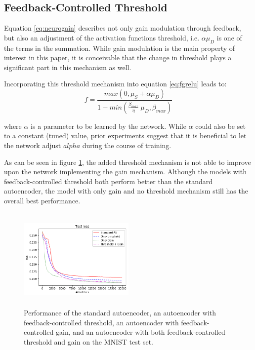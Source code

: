 \documentclass{article}
\begin{document}
\subsection{Feedback-Controlled Threshold} 
Equation \ref{eq:neurogain} describes not only gain modulation through feedback, but also an adjustment of the activation functions threshold, i.e. $\alpha \mu_D$ is one of the terms in the summation. While gain modulation is the main property of interest in this paper, it is conceivable that the change in threshold plays a significant part in this mechanism as well. 

Incorporating this threshold mechanism into equation \ref{eq:fgrelu} leads to: 
\begin{equation}
	f = \frac{max(0, \mu_S + \alpha \mu_D)}{1 - min(\frac{\beta_{max}}{\eta} \ \mu_D, \beta_{max})} 
\end{equation}

where $\alpha$ is a parameter to be learned by the network. While $\alpha$ could also be set to a constant (tuned) value, prior experiments suggest that it is beneficial to let the network adjust $alpha$ during the course of training. 

As can be seen in figure \ref{fig:threshold}, the added threshold mechanism is not able to improve upon the network implementing the gain mechanism. Although the models with feedback-controlled threshold both perform better than the standard autoencoder, the model with only gain and no threshold mechanism still has the overall best performance. 

\begin{figure}[H]
      \centering
      \includegraphics[width=0.5\textwidth,height=5cm,keepaspectratio]{img/appendix/threshold/threshold_test.png}
            \caption{Performance of the standard autoencoder, an autoencoder with feedback-controlled threshold, an autoencoder with feedback-controlled gain, and an autoencoder with both feedback-controlled threshold and gain on the MNIST test set.}
      \label{fig:threshold}
  \end{figure}
\end{document}
